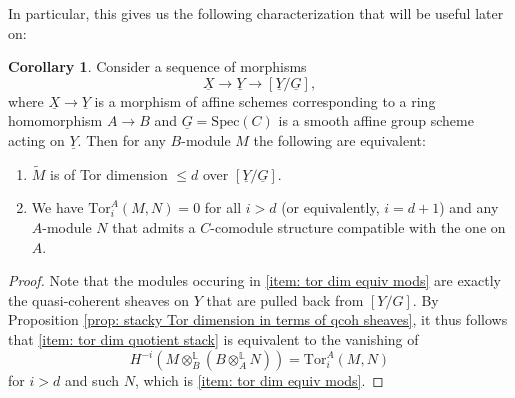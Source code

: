 \documentclass[11pt]{amsart}
\theoremstyle{definition}
\theoremstyle{definition}
\newtheorem{corollary}[theorem]{Corollary}
\newcommand{\ul}[1]{\underline{#1}}
\begin{document}
In particular, this gives us the following characterization that will be useful later on:
\begin{corollary}\label{corollary: relative Tor dimension quotient stack}
    Consider a sequence of morphisms
    \[
        \ul{X}\longrightarrow \ul{Y}\longrightarrow [\ul{Y}/\ul{G}],
    \]
where $\ul{X}\rightarrow \ul{Y}$ is a morphism of affine schemes corresponding to a ring homomorphism $A\rightarrow B$ and $\ul{G}=\text{Spec}(C)$ is a smooth affine group scheme acting on $\ul{Y}$. Then for any $B$-module $M$ the following are equivalent:
    \begin{enumerate}
        \item\label{item: tor dim quotient stack} $\widetilde{M}$ is of Tor dimension $\leq d$ over $[\ul{Y}/\ul{G}]$.
        \item\label{item: tor dim equiv mods} We have $\text{Tor}_{i}^A(M,N)=0$ for all $i>d$ (or equivalently, $i=d+1$) and any $A$-module $N$ that admits a $C$-comodule structure compatible with the one on $A$. 
    \end{enumerate}
\end{corollary}
\begin{proof}
    Note that the modules occuring in \eqref{item: tor dim equiv mods} are exactly the quasi-coherent sheaves on $Y$ that are pulled back from $[Y/G]$. By Proposition \ref{prop: stacky Tor dimension in terms of qcoh sheaves}, it thus follows that \eqref{item: tor dim quotient stack} is equivalent to the vanishing of
    \[
        H^{-i}(M\otimes^{\mathbb{L}}_B (B\otimes^\mathbb{L}_A N) ) = \text{Tor}_i^A(M,N)
    \]
    for $i>d$ and such $N$, which is \eqref{item: tor dim equiv mods}.
\end{proof}
\end{document}
